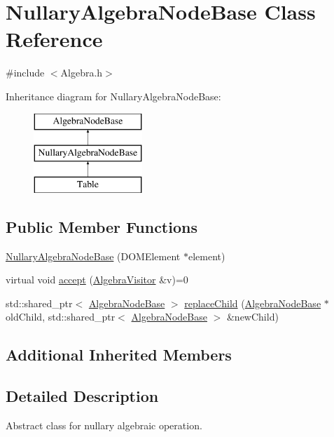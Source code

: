 \hypertarget{class_nullary_algebra_node_base}{\section{Nullary\+Algebra\+Node\+Base Class Reference}
\label{class_nullary_algebra_node_base}
}


{\ttfamily \#include $<$Algebra.\+h$>$}

Inheritance diagram for Nullary\+Algebra\+Node\+Base\+:\begin{figure}[H]
\begin{center}
\leavevmode
\includegraphics[height=3.000000cm]{class_nullary_algebra_node_base}
\end{center}
\end{figure}
\subsection*{Public Member Functions}
\begin{DoxyCompactItemize}
\item 
\hyperlink{class_nullary_algebra_node_base_a73108e19c00005dcda32af0b05060ea0}{Nullary\+Algebra\+Node\+Base} (D\+O\+M\+Element $\ast$element)
\item 
virtual void \hyperlink{class_nullary_algebra_node_base_a48446f68e1ddfc2357dcd048fd82ba80}{accept} (\hyperlink{class_algebra_visitor}{Algebra\+Visitor} \&v)=0
\item 
std\+::shared\+\_\+ptr$<$ \hyperlink{class_algebra_node_base}{Algebra\+Node\+Base} $>$ \hyperlink{class_nullary_algebra_node_base_af5a5e7f02db8509605ab852ef65b201b}{replace\+Child} (\hyperlink{class_algebra_node_base}{Algebra\+Node\+Base} $\ast$old\+Child, std\+::shared\+\_\+ptr$<$ \hyperlink{class_algebra_node_base}{Algebra\+Node\+Base} $>$ \&new\+Child)
\end{DoxyCompactItemize}
\subsection*{Additional Inherited Members}


\subsection{Detailed Description}
Abstract class for nullary algebraic operation. 

